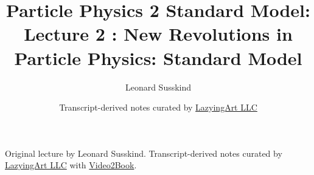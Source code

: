 \documentclass[11pt,oneside]{book}
\begin{document}
\frontmatter
\title{Particle Physics 2 Standard Model: Lecture 2 : New Revolutions in Particle Physics: Standard Model}
\author{Leonard Susskind}
\date{Transcript-derived notes curated by \href{https://lazying.art}{LazyingArt LLC}}
\maketitle
\begin{center}
\small Original lecture by Leonard Susskind. Transcript-derived notes curated by \href{https://lazying.art}{LazyingArt LLC} with \href{https://github.com/lachlanchen/Video2Book}{Video2Book}.
\end{center}
\clearpage
\mainmatter

\end{document}
